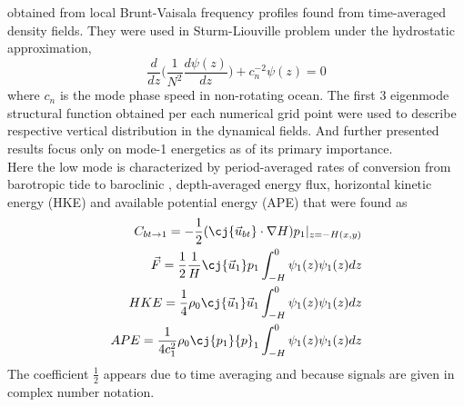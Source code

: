 \documentclass[12pt]{article}
\begin{document}
obtained from local Brunt-Vaisala frequency profiles found from time-averaged density fields. 
They were used in Sturm-Liouville problem under the hydrostatic approximation,
\begin{equation}
\frac{d}{dz}\Big( \frac{1}{N^2}  \frac{d \psi(z)}{dz}\Big) + c^{-2}_n \psi(z) 
= 0
\end{equation}
where $c_n$ is the mode phase speed in non-rotating ocean. The first 3 eigenmode structural 
function obtained per each numerical grid point were used to describe respective vertical 
distribution in the dynamical fields. And further presented results focus only on mode-1 energetics 
as of its primary importance.\\
Here the low mode is characterized by period-averaged rates of conversion from barotropic tide to 
baroclinic \citep{simmons2004internal, kurapov2003m}, depth-averaged energy flux, horizontal 
kinetic energy (HKE) and available potential energy (APE) that were found as
\begin{align}
\label{C3.eq:conv}
C_{bt\to 1} = -\frac{1}{2}(\cj{\vec{u}_{bt}} \cdot \nabla H) p_{1}|_{z = -H(x,y)}\\
\vec{F} = \frac{1}{2} \frac{1}{H} \cj{\vec{u}_1} p_1 \int_{-H}^{0} \psi_1(z) \psi_1(z) dz\\
HKE = \frac{1}{4} \rho_0 \cj{\vec{u}_1} \vec{u}_1 \int_{-H}^{0} \psi_1(z) \psi_1(z) dz\\
APE = \frac{1}{4c_1^2} \rho_0 \cj{p_1} {p}_1 \int_{-H}^{0} \psi_1(z) \psi_1(z) dz
\end{align}
The coefficient $\frac{1}{2}$ appears due to time averaging and because signals are given in 
complex number notation.\\
\end{document}
